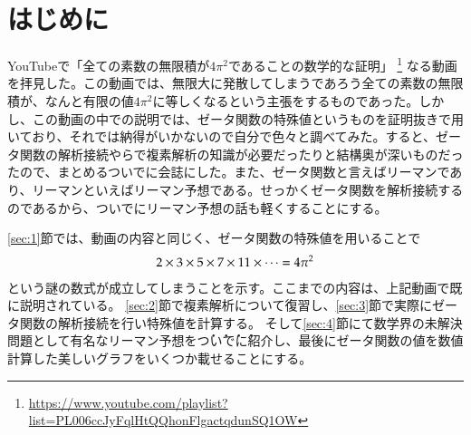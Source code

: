\documentclass[11pt,b5paper,papersize,dvipdfmx]{jsbook}
\begin{document}
%
\section*{はじめに}
YouTubeで「全ての素数の無限積が$4\pi^2$であることの数学的な証明」
\footnote{
  \url{https://www.youtube.com/playlist?list=PL006ccJyFqlHtQQhonFlgactqdunSQ1OW}
}
なる動画を拝見した。この動画では、無限大に発散してしまうであろう全ての素数の無限積が、なんと有限の値$4\pi^2$に等しくなるという主張をするものであった。しかし、この動画の中での説明では、ゼータ関数の特殊値というものを証明抜きで用いており、それでは納得がいかないので自分で色々と調べてみた。すると、ゼータ関数の解析接続やらで複素解析の知識が必要だったりと結構奥が深いものだったので、まとめるついでに会誌にした。また、ゼータ関数と言えばリーマンであり、リーマンといえばリーマン予想である。せっかくゼータ関数を解析接続するのであるから、ついでにリーマン予想の話も軽くすることにする。\par
\ref{sec:1}節では、動画の内容と同じく、ゼータ関数の特殊値を用いることで
\begin{align}
  2\times 3\times 5\times 7\times 11\times\cdots = 4\pi^2 \notag
\end{align}
という謎の数式が成立してしまうことを示す。ここまでの内容は、上記動画で既に説明されている。
\ref{sec:2}節で複素解析について復習し、\ref{sec:3}節で実際にゼータ関数の解析接続を行い特殊値を計算する。
そして\ref{sec:4}節にて数学界の未解決問題として有名なリーマン予想を\.つ\.い\.で\.に紹介し、最後にゼータ関数の値を数値計算した美しいグラフをいくつか載せることにする。\par


\end{document}
